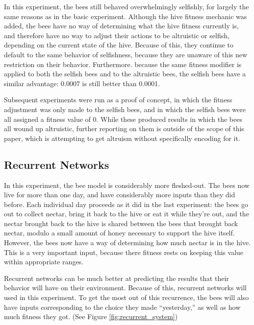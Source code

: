 \documentclass[11pt, letter]{article}
\begin{document}
			In this experiment, the bees still behaved overwhelmingly selfishly, for largely the same reasons as in the basic experiment. Although the hive fitness mechanic was added, the bees have no way of determining what the hive fitness currently is, and therefore have no way to adjust their actions to be altruistic or selfish, depending on the current state of the hive. Because of this, they continue to default to the same behavior of selfishness, because they are unaware of this new restriction on their behavior. Furthermore. because the same fitness modifier is applied to both the selfish bees and to the altruistic bees, the selfish bees have a similar advantage: 0.0007 is still better than 0.0001.

			Subsequent experiments were run as a proof of concept, in which the fitness adjustment was only made to the selfish bees, and in which the selfish bees were all assigned a fitness value of 0. While these produced results in which the bees all wound up altruistic, further reporting on them is outside of the scope of this paper, which is attempting to get altruism without specifically encoding for it.

		\subsection{Recurrent Networks} %
			\label{sub:recurrent_networks}


			In this experiment, the bee model is considerably more fleshed-out. The bees now live for more than one day, and have considerably more inputs than they did before. Each individual day proceeds as it did in the last experiment: the bees go out to collect nectar, bring it back to the hive or eat it while they're out, and the nectar brought back to the hive is shared between the bees that brought back nectar, modulo a small amount of honey necessary to support the hive itself. However, the bees now have a way of determining how much nectar is in the hive. This is a very important input, because there fitness rests on keeping this value within appropriate ranges. 

			Recurrent networks can be much better at predicting the results that their behavior will have on their environment. Because of this, recurrent networks will used in this experiment. To get the most out of this recurrence, the bees will also have inputs corresponding to the choice they made ``yesterday,'' as well as how much fitness they got. (See Figure \ref{fig:recurrent_system})
\end{document}
